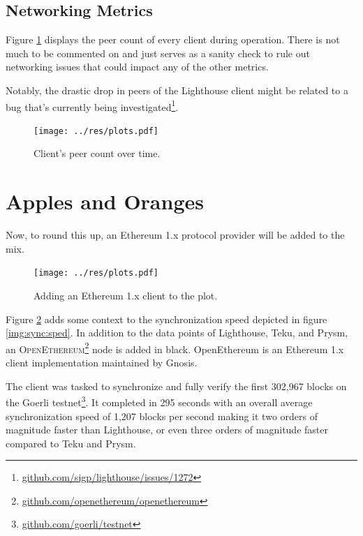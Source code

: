 \documentclass[twoside,twocolumn]{article}
\begin{document}
\subsection{Networking Metrics}
\label{sec:perf:p2p}
Figure \ref{img:per} displays the peer count of every client during operation. There is not much to be commented on and just serves as a sanity check to rule out networking issues that could impact any of the other metrics.\par

Notably, the drastic drop in peers of the Lighthouse client might be related to a bug that's currently being investigated\footnote{\href{https://github.com/sigp/lighthouse/issues/1272}{github.com/sigp/lighthouse/issues/1272}}.\par

\begin{figure}[t]
	\centering
	\texttt{[image: ../res/plots.pdf]}
	\caption{Client's peer count over time.}
	\label{img:per}
\end{figure}

\section{Apples and Oranges}
Now, to round this up, an Ethereum 1.x protocol provider will be added to the mix.\par

\begin{figure}[t]
	\centering
	\texttt{[image: ../res/plots.pdf]}
	\caption{Adding an Ethereum 1.x client to the plot.}
	\label{img:orange}
\end{figure}

Figure \ref{img:orange} adds some context to the synchronization speed depicted in figure \ref{img:sync:sped}. In addition to the data points of Lighthouse, Teku, and Prysm, an \textsc{OpenEthereum}\footnote{\href{https://github.com/openethereum/openethereum}{github.com/openethereum/openethereum}} node is added in black. OpenEthereum is an Ethereum 1.x client implementation maintained by Gnosis.\par

The client was tasked to synchronize and fully verify the first 302,967 blocks on the Goerli testnet\footnote{\href{https://github.com/goerli/testnet}{github.com/goerli/testnet}}. It completed in 295 seconds with an overall average synchronization speed of 1,207 blocks per second making it two orders of magnitude faster than Lighthouse, or even three orders of magnitude faster compared to Teku and Prysm.\par
\end{document}
